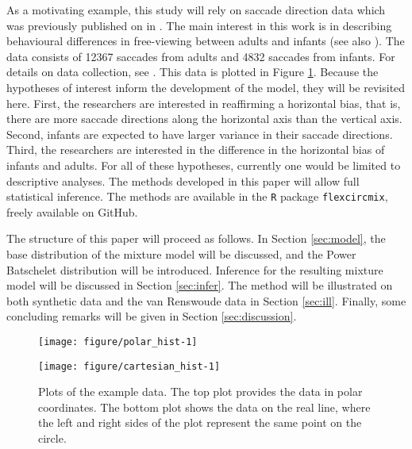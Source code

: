 As a motivating example, this study will rely on saccade direction data which was previously published on in \citet{van2016infants}. The main interest in this work is in describing behavioural differences in free-viewing between adults and infants (see also \citet{aslin2007s}). The data consists of 12367  saccades from adults and 4832 saccades from infants. For details on data collection, see \citet{van2016infants}. This data is plotted in Figure \ref{scd_ex}. Because the hypotheses of interest inform the development of the model, they will be revisited here. First, the researchers are interested in reaffirming a horizontal bias, that is, there are more saccade directions along the horizontal axis than the vertical axis. Second, infants are expected to have larger variance in their saccade directions. Third, the researchers are interested in the difference in the horizontal bias of infants and adults. For all of these hypotheses, currently one would be limited to descriptive analyses. The methods developed in this paper will allow full statistical inference. The methods are available in the \texttt{R} package \texttt{flexcircmix}, freely available on GitHub.

The structure of this paper will proceed as follows. In Section \ref{sec:model}, the base distribution of the mixture model will be discussed, and the Power Batschelet distribution will be introduced. Inference for the resulting mixture model will be discussed in Section \ref{sec:infer}. The method will be illustrated on both synthetic data and the van Renswoude data in Section \ref{sec:ill}. Finally, some concluding remarks will be given in Section \ref{sec:discussion}.






\begin{figure}
\centering
\begin{knitrout}
\color{fgcolor}
\texttt{[image: figure/polar\_hist-1]} 

\end{knitrout}
\centering \vspace{-1.5cm}
\begin{knitrout}
\color{fgcolor}
\texttt{[image: figure/cartesian\_hist-1]} 

\end{knitrout}
\caption{Plots of the example data. The top plot provides the data in polar coordinates. The bottom plot shows the data on the real line, where the left and right sides of the plot represent the same point on the circle.}
\label{scd_ex}
\end{figure}


